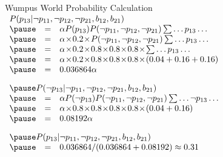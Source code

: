 \documentclass[14pt]{beamer}
\begin{document}
\begin{frame}{Wumpus World Probability Calculation}
	$
	\begin{array}{lll}
	\lefteqn{P(p_{13}|\lnot p_{11}, \lnot p_{12}, \lnot p_{21}, b_{12}, b_{21})}
	\\
	\pause
	& = &
	\alpha
	P(p_{13})
	P(\lnot p_{11},\lnot p_{12},\lnot p_{21})
	\sum\ldots p_{13}\ldots
	\\
	\pause
	& = &
	\alpha \!\times\!
  0.2 \!\times\!
	P(\lnot p_{11},\lnot p_{12},\lnot p_{21})
	\sum\ldots p_{13}\ldots
  \\
  \pause
  & = &
  \alpha \!\times\!
  0.2 \!\times\!
  0.8 \!\times\! 0.8 \!\times\! 0.8 \!\times\!
  \sum\ldots p_{13}\ldots
  \\
  \pause
  & = &
  \alpha \!\times\!
  0.2 \!\times\!
  0.8 \!\times\! 0.8 \!\times\! 0.8 \!\times\!
  (0.04 + 0.16 + 0.16)
  \\
  \pause
  & = & 0.036864\alpha
  \\[1em]
  \pause
	\lefteqn{P(\lnot p_{13}|\lnot p_{11}, \lnot p_{12}, \lnot p_{21}, b_{12}, b_{21})}
	\\
	\pause
	& = & 
	\alpha
	P(\lnot p_{13})
	P(\lnot p_{11},\lnot p_{12},\lnot p_{21})
	\sum\ldots \lnot p_{13}\ldots
  \\
  \pause
  & = &
  \alpha \!\times\!
  0.8 \!\times\!
  0.8 \!\times\! 0.8 \!\times\! 0.8 \!\times\!
  (0.04 + 0.16)
  \\
  \pause
  & = & 0.08192\alpha
  \\[1em]
  \pause
  \lefteqn{P(p_{13}|\lnot p_{11}, \lnot p_{12}, \lnot p_{21}, b_{12}, b_{21})}
  \\
  \pause
  & = & 0.036864 / (0.036864 + 0.08192) \approx 0.31
  \end{array}
  $
\end{frame}
\end{document}
